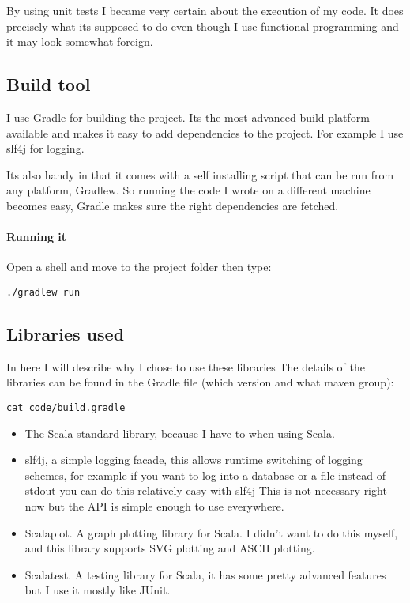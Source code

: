 \documentclass{article}
\begin{document}
\begin{empfile}
By using unit tests I became very certain about the execution of my code.
It does precisely what its supposed to do even though I use functional
programming and it may look somewhat foreign.

\subsection{Build tool}
I use Gradle for building the project. Its the most advanced build platform
available and makes it easy to add dependencies to the project.
For example I use slf4j for logging.

Its also handy in that it comes with a self installing script that can be run
from any platform, Gradlew. So running the code I wrote on a different machine
becomes easy, Gradle makes sure the right dependencies are fetched.

\paragraph{Running it}

Open a shell and move to the project folder then type:

\lstset{language=Bash}
\begin{lstlisting}[frame=single]
	./gradlew run
\end{lstlisting}

\subsection{Libraries used}
In here I will describe why I chose to use these libraries
The details of the libraries can be found in the Gradle file (which
version and what maven group):

\begin{lstlisting}[frame=single]
	cat code/build.gradle
\end{lstlisting}


\begin{itemize}
	\item The Scala standard library, because I have to when using Scala.
	\item slf4j, a simple logging facade, this allows runtime switching of
		logging schemes, for example if you want to log into a database or
		a file instead of stdout you can do this relatively easy with slf4j
		This is not necessary right now but the API is simple enough to use
		everywhere.
	\item Scalaplot. A graph plotting library for Scala. I didn't want to
		do this myself, and this library supports SVG plotting and ASCII
		plotting.
	\item Scalatest. A testing library for Scala, it has some pretty advanced
		features but I use it mostly like JUnit.
\end{itemize}


\end{empfile}
\end{document}
